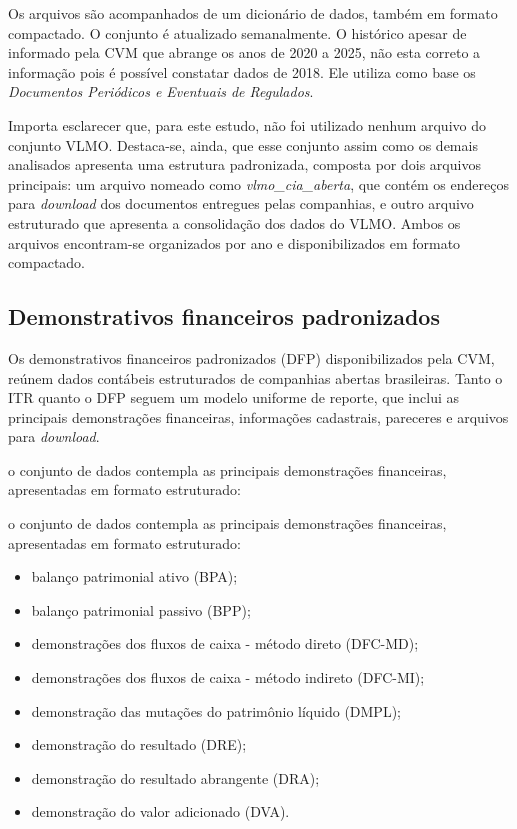 Os arquivos são acompanhados de um dicionário de dados, também em formato compactado. O conjunto é atualizado semanalmente. O histórico apesar de informado pela CVM que abrange os anos de 2020 a 2025, não esta correto a informação pois é possível constatar dados de 2018. Ele utiliza como base os \textit{Documentos Periódicos e Eventuais de Regulados}.

Importa esclarecer que, para este estudo, não foi utilizado nenhum arquivo do conjunto VLMO. Destaca-se, ainda, que esse conjunto assim como os demais analisados apresenta uma estrutura padronizada, composta por dois arquivos principais: um arquivo nomeado como \textit{vlmo\_cia\_aberta}, que contém os endereços para \textit{download} dos documentos entregues pelas companhias, e outro arquivo estruturado que apresenta a consolidação dos dados do VLMO. Ambos os arquivos encontram-se organizados por ano e disponibilizados em formato compactado.

\subsection{Demonstrativos financeiros padronizados}
Os demonstrativos financeiros padronizados (DFP) disponibilizados pela CVM, reúnem dados contábeis estruturados de companhias abertas brasileiras. Tanto o ITR quanto o DFP seguem um modelo uniforme de reporte, que inclui as principais demonstrações financeiras, informações cadastrais, pareceres e arquivos para \textit{download}.

o conjunto de dados contempla as principais demonstrações financeiras, apresentadas em formato estruturado:

o conjunto de dados contempla as principais demonstrações financeiras, apresentadas em formato estruturado:

\begin{itemize}
	\item balanço patrimonial ativo (BPA);
	\item balanço patrimonial passivo (BPP);
	\item demonstrações dos fluxos de caixa - método direto (DFC-MD);
	\item demonstrações dos fluxos de caixa - método indireto (DFC-MI);
	\item demonstração das mutações do patrimônio líquido (DMPL);
	\item demonstração do resultado (DRE);
	\item demonstração do resultado abrangente (DRA);
	\item demonstração do valor adicionado (DVA).
\end{itemize}

